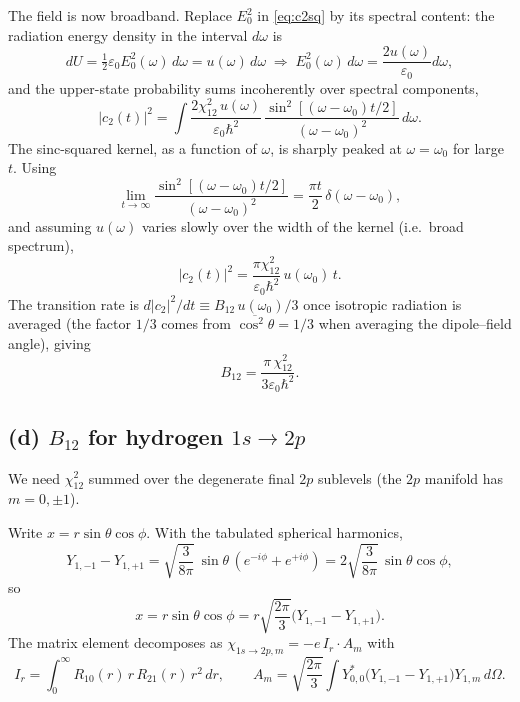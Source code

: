 \documentclass[11pt]{article}
\begin{document}
The field is now broadband. Replace $E_0^2$ in \eqref{eq:c2sq} by its spectral content: the radiation energy density in the interval $d\omega$ is
\begin{equation*}
    dU = \tfrac12\varepsilon_0 E_0^2(\omega)\,d\omega = u(\omega)\,d\omega \;\Longrightarrow\; E_0^2(\omega)\,d\omega = \frac{2u(\omega)}{\varepsilon_0}d\omega,
\end{equation*}
and the upper-state probability sums incoherently over spectral components,
\begin{equation*}
    |c_2(t)|^2 = \int\frac{2\chi_{12}^2\,u(\omega)}{\varepsilon_0\hbar^2}\,\frac{\sin^2[(\omega-\omega_0)t/2]}{(\omega-\omega_0)^2}\,d\omega.
\end{equation*}
The sinc-squared kernel, as a function of $\omega$, is sharply peaked at $\omega=\omega_0$ for large $t$. Using
\begin{equation*}
    \lim_{t\to\infty}\frac{\sin^2[(\omega-\omega_0)t/2]}{(\omega-\omega_0)^2} = \frac{\pi t}{2}\,\delta(\omega-\omega_0),
\end{equation*}
and assuming $u(\omega)$ varies slowly over the width of the kernel (i.e.\ broad spectrum),
\begin{equation*}
    |c_2(t)|^2 = \frac{\pi\chi_{12}^2}{\varepsilon_0\hbar^2}\,u(\omega_0)\,t.
\end{equation*}
The transition rate is $d|c_2|^2/dt\equiv B_{12}\,u(\omega_0)/3$ once isotropic radiation is averaged (the factor $1/3$ comes from $\overline{\cos^2\theta}=1/3$ when averaging the dipole--field angle), giving
\begin{equation}
    \boxed{\;B_{12} = \frac{\pi\,\chi_{12}^2}{3\varepsilon_0\hbar^2}.\;}\label{eq:B12}
\end{equation}

\subsection*{(d) $B_{12}$ for hydrogen $1s\to 2p$}

We need $\chi_{12}^2$ summed over the degenerate final $2p$ sublevels (the $2p$ manifold has $m=0,\pm1$).

Write $x=r\sin\theta\cos\phi$. With the tabulated spherical harmonics,
\begin{equation*}
    Y_{1,-1}-Y_{1,+1} = \sqrt{\frac{3}{8\pi}}\,\sin\theta\,(e^{-i\phi}+e^{+i\phi}) = 2\sqrt{\frac{3}{8\pi}}\,\sin\theta\cos\phi,
\end{equation*}
so
\begin{equation*}
    x = r\sin\theta\cos\phi = r\sqrt{\frac{2\pi}{3}}\bigl(Y_{1,-1}-Y_{1,+1}\bigr).
\end{equation*}
The matrix element decomposes as $\chi_{1s\to 2p,m}=-e\,I_r\cdot A_m$ with
\begin{equation*}
    I_r = \int_0^\infty R_{10}(r)\,r\,R_{21}(r)\,r^2\,dr, \qquad A_m = \sqrt{\frac{2\pi}{3}}\!\int Y_{0,0}^*\bigl(Y_{1,-1}-Y_{1,+1}\bigr)Y_{1,m}\,d\Omega.
\end{equation*}
\end{document}
